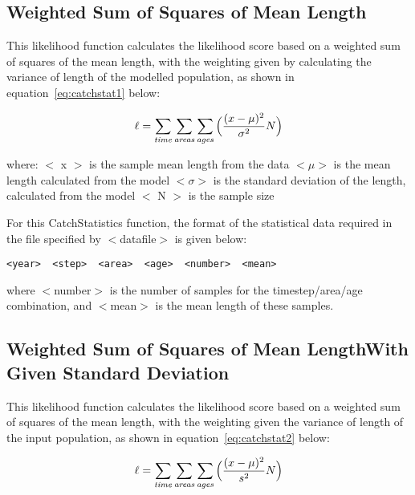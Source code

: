 \documentclass [a4paper, 10pt]{book}
\begin{document}
\subsection{Weighted Sum of Squares of Mean Length}
This likelihood function calculates the likelihood score based on a weighted sum of squares of the mean length, with the weighting given by calculating the variance of length of the modelled population, as shown in equation~\ref{eq:catchstat1} below:

\begin{equation}\label{eq:catchstat1}
\ell = \sum_{\it time}\sum_{\it areas}\sum_{\it ages} \Big(\frac{(x-\mu)^2} {\sigma^2} N\Big)
\end{equation}

where:\newline
$<$ x $>$ is the sample mean length from the data\newline
$<\mu>$ is the mean length calculated from the model\newline
$<\sigma>$ is the standard deviation of the length, calculated from the model\newline
$<$ N $>$ is the sample size

\bigskip
For this CatchStatistics function, the format of the statistical data required in the file specified by $<$datafile$>$ is given below:

{\small\begin{verbatim}
<year>  <step>  <area>  <age>  <number>  <mean>
\end{verbatim}}

where $<$number$>$ is the number of samples for the timestep/area/age combination, and $<$mean$>$ is the mean length of these samples.

\subsection{Weighted Sum of Squares of Mean Length\newline With Given Standard Deviation}
This likelihood function calculates the likelihood score based on a weighted sum of squares of the mean length, with the weighting given the variance of length of the input population, as shown in  equation~\ref{eq:catchstat2} below:

\begin{equation}\label{eq:catchstat2}
\ell = \sum_{\it time}\sum_{\it areas}\sum_{\it ages} \Big(\frac{(x-\mu)^2} {s^2} N\Big)
\end{equation}
\end{document}
